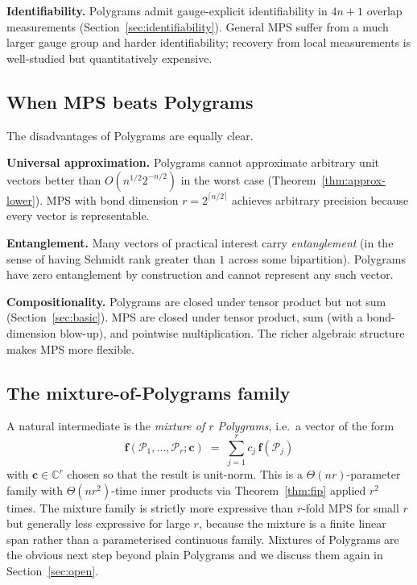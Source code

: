 \documentclass[11pt,letterpaper]{article}
\theoremstyle{definition}
\newcommand{\C}{\mathbb{C}}
\newcommand{\Polygram}{\mathcal{P}}
\begin{document}
\textbf{Identifiability.} Polygrams admit gauge-explicit identifiability
in $4n + 1$ overlap measurements (Section~\ref{sec:identifiability}).
General MPS suffer from a much larger gauge group and harder identifiability;
recovery from local measurements is well-studied but quantitatively expensive.

\subsection{When MPS beats Polygrams}

The disadvantages of Polygrams are equally clear.

\textbf{Universal approximation.} Polygrams cannot approximate arbitrary
unit vectors better than $O(n^{1/2} 2^{-n/2})$ in the worst case
(Theorem~\ref{thm:approx-lower}). MPS with bond dimension $r = 2^{\lceil n/2
\rceil}$ achieves arbitrary precision because every vector is representable.

\textbf{Entanglement.} Many vectors of practical interest carry
\emph{entanglement} (in the sense of having Schmidt rank greater than $1$
across some bipartition). Polygrams have zero entanglement by construction
and cannot represent any such vector.

\textbf{Compositionality.} Polygrams are closed under tensor product but not
sum (Section~\ref{sec:basic}). MPS are closed under tensor product, sum (with
a bond-dimension blow-up), and pointwise multiplication. The richer algebraic
structure makes MPS more flexible.

\subsection{The mixture-of-Polygrams family}

A natural intermediate is the \emph{mixture of $r$ Polygrams}, i.e.\ a vector
of the form
\[
\bm{f}(\Polygram_{1}, \dots, \Polygram_{r}; \bm{c})
   \;=\; \sum_{j=1}^{r} c_{j}\, \bm{f}(\Polygram_{j})
\]
with $\bm{c} \in \C^{r}$ chosen so that the result is unit-norm. This is a
$\Theta(n r)$-parameter family with $\Theta(n r^{2})$-time inner products via
Theorem~\ref{thm:fip} applied $r^{2}$ times. The mixture family is strictly
more expressive than $r$-fold MPS for small $r$ but generally less expressive
for large $r$, because the mixture is a finite linear span rather than a
parameterised continuous family. Mixtures of Polygrams are the obvious next
step beyond plain Polygrams and we discuss them again in
Section~\ref{sec:open}.
\end{document}
